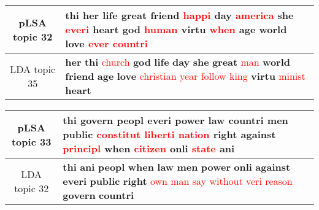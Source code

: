 \begin{center}\begin{tabularx}{\textwidth} {
  | c | >{\raggedright\arraybackslash}X | } \hline 
pLSA topic 32 & \textbf{thi} \textbf{her} \textbf{life} \textbf{great} \textbf{friend} \textcolor{red}{happi} \textbf{day} \textcolor{red}{america} \textbf{she} \textcolor{red}{everi} \textbf{heart} \textbf{god} \textcolor{red}{human} \textbf{virtu} \textcolor{red}{when} \textbf{age} \textbf{world} \textbf{love} \textcolor{red}{ever} \textcolor{red}{countri} \\ \hline 
LDA topic 35 & \textbf{her} \textbf{thi} \textcolor{red}{church} \textbf{god} \textbf{life} \textbf{day} \textbf{she} \textbf{great} \textcolor{red}{man} \textbf{world} \textbf{friend} \textbf{age} \textbf{love} \textcolor{red}{christian} \textcolor{red}{year} \textcolor{red}{follow} \textcolor{red}{king} \textbf{virtu} \textcolor{red}{minist} \textbf{heart} \\ \hline 
\end{tabularx}

\end{center}

\begin{center}\begin{tabularx}{\textwidth} {
  | c | >{\raggedright\arraybackslash}X | } \hline 
pLSA topic 33 & \textbf{thi} \textbf{govern} \textbf{peopl} \textbf{everi} \textbf{power} \textbf{law} \textbf{countri} \textbf{men} \textbf{public} \textcolor{red}{constitut} \textcolor{red}{liberti} \textcolor{red}{nation} \textbf{right} \textbf{against} \textcolor{red}{principl} \textbf{when} \textcolor{red}{citizen} \textbf{onli} \textcolor{red}{state} \textbf{ani} \\ \hline 
LDA topic 32 & \textbf{thi} \textbf{ani} \textbf{peopl} \textbf{when} \textbf{law} \textbf{men} \textbf{power} \textbf{onli} \textbf{against} \textbf{everi} \textbf{public} \textbf{right} \textcolor{red}{own} \textcolor{red}{man} \textcolor{red}{say} \textcolor{red}{without} \textcolor{red}{veri} \textcolor{red}{reason} \textbf{govern} \textbf{countri} \\ \hline 
\end{tabularx}

\end{center}

